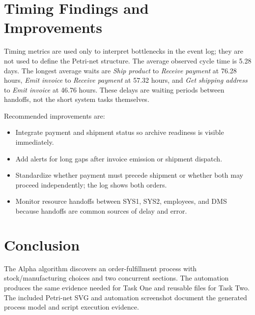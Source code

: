 \documentclass[11pt,a4paper]{article}
\begin{document}

\section{Timing Findings and Improvements}
Timing metrics are used only to interpret bottlenecks in the event log; they are not used to define the Petri-net structure. The average observed cycle time is 5.28 days. The longest average waits are \textit{Ship product} to \textit{Receive payment} at 76.28 hours, \textit{Emit invoice} to \textit{Receive payment} at 57.32 hours, and \textit{Get shipping address} to \textit{Emit invoice} at 46.76 hours. These delays are waiting periods between handoffs, not the short system tasks themselves.

Recommended improvements are:
\begin{itemize}
  \item Integrate payment and shipment status so archive readiness is visible immediately.
  \item Add alerts for long gaps after invoice emission or shipment dispatch.
  \item Standardize whether payment must precede shipment or whether both may proceed independently; the log shows both orders.
  \item Monitor resource handoffs between SYS1, SYS2, employees, and DMS because handoffs are common sources of delay and error.
\end{itemize}

\section{Conclusion}
The Alpha algorithm discovers an order-fulfillment process with stock/manufacturing choices and two concurrent sections. The automation produces the same evidence needed for Task One and reusable files for Task Two. The included Petri-net SVG and automation screenshot document the generated process model and script execution evidence.
\end{document}
